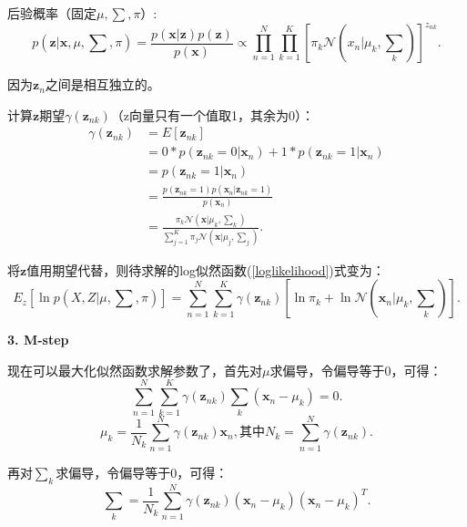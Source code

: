 \documentclass[UTF8]{ctexart}
\begin{document}
后验概率（固定$\mu,\sum,\pi$）:
\begin{equation}
  p\left(\mathbf z\big|\mathbf x,\mu,\sum,\pi\right) = \frac{p(\mathbf x|\mathbf z)p(\mathbf z)}{p(\mathbf x)} \propto \prod_{n=1}^N\prod_{k=1}^K\left[{\pi_k\mathcal N\left(x_n\big|\mu_k,\sum_k\right)}\right]^{z_{nk}}.
\end{equation}

因为${\mathbf z_n}$之间是相互独立的。

计算$\mathbf z$期望$\gamma(\mathbf z_{nk})$（z向量只有一个值取1，其余为0）：
\begin{equation}
  \begin{split}
    \gamma(\mathbf z_{nk}) &= E[\mathbf z_{nk}]\\
    &= 0*p(\mathbf z_{nk}=0|\mathbf x_n)+1*p(\mathbf z_{nk}=1|\mathbf x_n)\\
    &=p(\mathbf z_{nk}=1|\mathbf x_n)\\
    &=\frac{p(\mathbf z_{nk}=1)p(\mathbf x_n|\mathbf z_{nk}=1)}{p(\mathbf x_n)}\\
    &=\frac{\pi_k\mathcal N\left(\mathbf x\big|\mu_k,\sum_k\right)}{\sum_{j=1}^K\pi_j\mathcal N\left(\mathbf x\big|\mu_j,\sum_j\right)}.
  \end{split}
\end{equation}

将$\mathbf z$值用期望代替，则待求解的log似然函数(\ref{loglikelihood})式变为：
\begin{equation}
  E_z\left[\ln p\left(X,Z\big|\mu,\sum,\pi\right)\right] = \sum_{n=1}^N\sum_{k=1}^K\gamma (\mathbf z_{nk})\left[\ln\pi_k + \ln\mathcal N\left(\mathbf x_n\big|\mu_k,\sum_k\right)\right].
\end{equation}

\textbf{3. M-step}

现在可以最大化似然函数求解参数了，首先对$\mu$求偏导，令偏导等于0，可得：
\begin{equation}
  \sum_{n=1}^N\sum_{k=1}^K\gamma (\mathbf z_{nk})\sum_k(\mathbf x_n-\mu_k) = 0.
\end{equation}
\begin{equation}
  \mu_k = \frac{1}{N_k}\sum_{n=1}^N\gamma (\mathbf z_{nk}){\mathbf x_n},\text{其中}N_k = \sum_{n=1}^N\gamma (\mathbf z_{nk}).
\end{equation}

再对$\sum_k$求偏导，令偏导等于0，可得：
\begin{equation}
  \sum_k = \frac{1}{N_k}\sum_{n=1}^N\gamma (\mathbf z_{nk})(\mathbf x_n-\mu_k)(\mathbf x_n-\mu_k)^T.
\end{equation}
\end{document}
